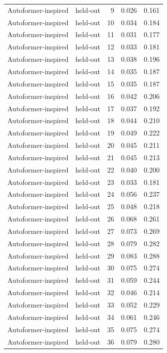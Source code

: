 \begin{tabular}{llrrr}
Autoformer-inspired & held-out & 9 & 0.026 & 0.161 \\
Autoformer-inspired & held-out & 10 & 0.034 & 0.184 \\
Autoformer-inspired & held-out & 11 & 0.031 & 0.177 \\
Autoformer-inspired & held-out & 12 & 0.033 & 0.181 \\
Autoformer-inspired & held-out & 13 & 0.038 & 0.196 \\
Autoformer-inspired & held-out & 14 & 0.035 & 0.187 \\
Autoformer-inspired & held-out & 15 & 0.035 & 0.187 \\
Autoformer-inspired & held-out & 16 & 0.042 & 0.206 \\
Autoformer-inspired & held-out & 17 & 0.037 & 0.192 \\
Autoformer-inspired & held-out & 18 & 0.044 & 0.210 \\
Autoformer-inspired & held-out & 19 & 0.049 & 0.222 \\
Autoformer-inspired & held-out & 20 & 0.045 & 0.211 \\
Autoformer-inspired & held-out & 21 & 0.045 & 0.213 \\
Autoformer-inspired & held-out & 22 & 0.040 & 0.200 \\
Autoformer-inspired & held-out & 23 & 0.033 & 0.181 \\
Autoformer-inspired & held-out & 24 & 0.056 & 0.237 \\
Autoformer-inspired & held-out & 25 & 0.048 & 0.218 \\
Autoformer-inspired & held-out & 26 & 0.068 & 0.261 \\
Autoformer-inspired & held-out & 27 & 0.073 & 0.269 \\
Autoformer-inspired & held-out & 28 & 0.079 & 0.282 \\
Autoformer-inspired & held-out & 29 & 0.083 & 0.288 \\
Autoformer-inspired & held-out & 30 & 0.075 & 0.274 \\
Autoformer-inspired & held-out & 31 & 0.059 & 0.244 \\
Autoformer-inspired & held-out & 32 & 0.046 & 0.214 \\
Autoformer-inspired & held-out & 33 & 0.052 & 0.229 \\
Autoformer-inspired & held-out & 34 & 0.061 & 0.246 \\
Autoformer-inspired & held-out & 35 & 0.075 & 0.274 \\
Autoformer-inspired & held-out & 36 & 0.079 & 0.280 \\

\end{tabular}
